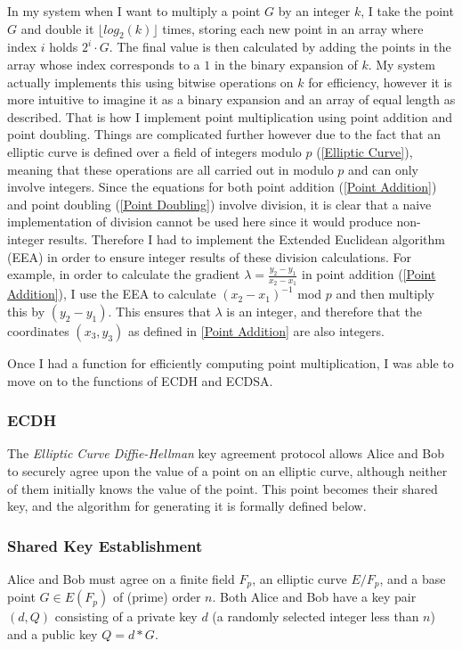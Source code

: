 \documentclass[12pt,a4paper]{article}
\begin{document}
In my system when I want to multiply a point $G$ by an integer $k$, 
I take the point $G$ and double it $\lfloor log_2(k) \rfloor$ times, storing each new point in an array where index $i$ holds $2^i \cdot G$. 
The final value is then calculated by adding the points in the array whose index corresponds to a $1$ in the binary expansion of $k$. 
My system actually implements this using bitwise operations on $k$ for efficiency, 
however it is more intuitive to imagine it as a binary expansion and an array of equal length as described. 
That is how I implement point multiplication using point addition and point doubling. 
Things are complicated further however due to the fact that an elliptic curve is defined over a field of integers modulo $p$ (\ref{Elliptic Curve}), 
meaning that these operations are all carried out in modulo $p$ and can only involve integers. 
Since the equations for both point addition (\ref{Point Addition}) and point doubling (\ref{Point Doubling}) involve division, 
it is clear that a naive implementation of division cannot be used here since it would produce non-integer results. 
Therefore I had to implement the Extended Euclidean algorithm (EEA) in order to ensure integer results of these division calculations. 
For example, in order to calculate the gradient $\lambda = \frac{y_2-y_1}{x_2-x_1}$ in point addition (\ref{Point Addition}), 
I use the EEA to calculate $(x_2-x_1)^{-1}$ mod $p$ and then multiply this by $(y_2-y_1)$. 
This ensures that $\lambda$ is an integer, and therefore that the coordinates $(x_3,y_3)$ as defined in \ref{Point Addition} 
are also integers. 

Once I had a function for efficiently computing point multiplication, I was able to move on to the functions of ECDH and ECDSA. 

\subsubsection{ECDH} \noindent \label{ECDH}
The \emph{Elliptic Curve Diffie-Hellman} key agreement protocol allows Alice and Bob 
to securely agree upon the value of a point on an elliptic curve, although neither of them initially knows the value of the point. 
This point becomes their shared key, and the algorithm for generating it is formally defined below. 


\subsubsection{Shared Key Establishment} \noindent \label{SharedKey}
Alice and Bob must agree on a finite field $F_p$, an elliptic curve $E/F_p$, and a base point $G \in E(F_p)$  of (prime) order $n$.
Both Alice and Bob have a key pair $(d,Q)$ consisting of a private key $d$ (a randomly selected integer less than $n$) 
and a public key $Q = d * G$.
\end{document}
